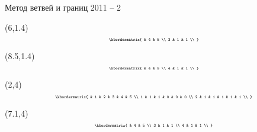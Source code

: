 \documentclass[10pt, dvipsnames]{beamer}
\begin{document}
\begin{frame}{Метод ветвей и границ 2011 -- 2}
	\begin{textblock}{1}(6,1.4)
\[
\tiny
  \kbordermatrix{
	  & 4 & 5 \\
	3 &	1 & 1 \\
  }
\]
	\end{textblock}
	
	\begin{textblock}{1}(8.5,1.4)
\[
\tiny
  \kbordermatrix{
	  & 4 & 5 \\
	4 &	1 & 1 \\
  }
\]
	\end{textblock}
	
	\begin{textblock}{1}(2,4)
\[
\tiny
  \kbordermatrix{
	  & 1 & 2 & 3 & 4 & 5 \\
	1 & 1 & 1 & 0 & 0 & 0 \\
    2 & 1 & 1 & 1 & 1 & 1 \\
  }
\]
	\end{textblock}
	
	\begin{textblock}{1}(7.1,4)
\[
\tiny
  \kbordermatrix{
      & 4 & 5 \\
	3 & 1 & 1 \\
	4 &	1 & 1 \\
  }
\]
	\end{textblock}

\end{frame}
\end{document}
